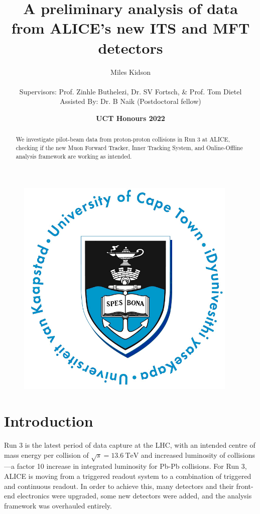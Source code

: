 \documentclass[11pt]{article}
\title{{\Huge A preliminary analysis of data from ALICE's new ITS and MFT detectors}}
\author{{\Large Miles Kidson}\\ \\
Supervisors: Prof. Zinhle Buthelezi, Dr. SV Fortsch, \& Prof. Tom Dietel\\
Assisted By: Dr. B Naik (Postdoctoral fellow)}
\date{\textbf{UCT Honours 2022}}
\numberwithin{equation}{section}
\numberwithin{figure}{section}
\numberwithin{table}{section}
\begin{document}
    
\maketitle

\begin{figure}[h]
    \begin{center}
        \includegraphics{Figs/UCT.jpg}
    \end{center}
\end{figure}

\begin{abstract}
    \centering
    We investigate pilot-beam data from proton-proton collisions in Run 3 at ALICE, checking if the new Muon Forward Tracker, Inner Tracking System, and Online-Offline analysis framework are working as intended. 
\end{abstract}

\newpage
\tableofcontents

\newpage
\section{Introduction}\label{sec:Introduction}
Run 3 is the latest period of data capture at the LHC, with an intended centre of mass energy per collision of $\sqrt{s}=\SI{13.6}{\tera\electronvolt}$ and increased luminosity of collisions---a factor 10 increase in integrated luminosity for Pb-Pb collisions. For Run 3, ALICE is moving from a triggered readout system to a combination of triggered and continuous readout. In order to achieve this, many detectors and their front-end electronics were upgraded, some new detectors were added, and the analysis framework was overhauled entirely. 
\end{document}
